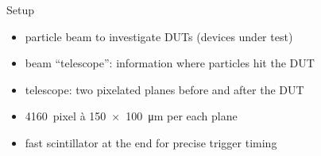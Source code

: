 \begin{block}{Setup}
	\begin{itemize}
		\item particle beam to investigate DUTs (devices under test)
		\item beam ``telescope'': information where particles hit the DUT
		\item telescope: two pixelated planes before and after the DUT
		\item \SI{4160}{pixel} à \SI{150x100}{\um} per each plane
		\item fast scintillator at the end for precise trigger timing 
	\end{itemize}

\end{block}
